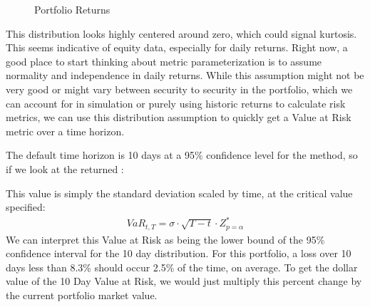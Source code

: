 \documentclass[letterpaper,10pt,english]{sphinxmanual}
\begin{document}
\begin{figure}[htbp]
\centering
\capstart

\noindent{}
\caption{Portfolio Returns}\label{\detokenize{gettingstarted:id2}}\end{figure}

This distribution looks highly centered around zero, which could signal
kurtosis. This seems indicative of equity data, especially for daily
returns. Right now, a good place to start thinking about metric
parameterization is to assume normality and independence in daily
returns. While this assumption might not be very good or might vary
between security to security in the portfolio, which we can account for
in simulation or purely using historic returns to calculate risk
metrics, we can use this distribution assumption to quickly get a Value
at Risk metric over a time horizon.

The default time horizon is 10 days at a 95\% confidence level for the
 method, so if we look at the returned
:

%
\begin{sphinxVerbatim}[commandchars=\\\{\}]
\end{sphinxVerbatim}

This value is simply the standard deviation scaled by time, at the
critical value specified:
\begin{equation*}
\begin{split}VaR_{t, T} = \sigma \cdot \sqrt{T-t} \cdot Z^{*}_{p = \alpha}\end{split}
\end{equation*}
We can interpret this Value at Risk as being the lower bound of the 95\%
confidence interval for the 10 day distribution. For this portfolio, a
loss over 10 days less than 8.3\% should occur 2.5\% of the time, on
average. To get the dollar value of the 10 Day Value at Risk, we would
just multiply this percent change by the current portfolio market value.

%
\begin{sphinxVerbatim}[commandchars=\\\{\}]
      
\end{sphinxVerbatim}
\end{document}
